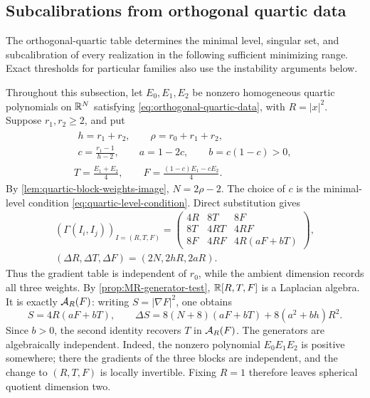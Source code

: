 \subsection{Subcalibrations from orthogonal quartic data}
\label{sec:quartic-table-existence}

The orthogonal-quartic table determines the minimal level, singular
set, and subcalibration of every realization in the following sufficient
minimizing range. Exact thresholds for particular families also use
the instability arguments below.

Throughout this subsection, let $E_0,E_1,E_2$ be nonzero homogeneous
quartic polynomials on $\mathbb R^N$ satisfying
\eqref{eq:orthogonal-quartic-data}, with $R=|x|^2$.  Suppose
$r_1,r_2\geq2$, and put
\begin{gather}
 \begin{gathered}
 h=r_1+r_2,\qquad \rho=r_0+r_1+r_2,\\
 c=\frac{r_1-1}{h-2},\qquad a=1-2c,\qquad b=c(1-c)>0,
 \end{gathered}
 \label{eq:quartic-general-weights}\\
 T=\frac{E_1+E_2}{4},\qquad
 F=\frac{(1-c)E_1-cE_2}{4}.
 \label{eq:quartic-general-generators}
\end{gather}
By \cref{lem:quartic-block-weights-image}, $N=2\rho-2$.
The choice of $c$ is the minimal-level condition
\eqref{eq:quartic-level-condition}.  Direct substitution gives
\begin{equation}\label{bh:reduced-table}
 \begin{gathered}
 (\Gamma(I_i,I_j))_{I=(R,T,F)}=
 \begin{pmatrix}
 4R&8T&8F\\
 8T&4RT&4RF\\
 8F&4RF&4R(aF+bT)
 \end{pmatrix},\\
 (\Delta R,\Delta T,\Delta F)=(2N,2hR,2aR).
 \end{gathered}
\end{equation}
Thus the gradient table is independent of $r_0$, while the ambient
dimension records all three weights.  By
\cref{prop:MR-generator-test}, $\mathbb R[R,T,F]$ is a Laplacian algebra.
It is exactly $\mathcal A_R(F)$: writing $S=|\nabla F|^2$, one obtains
\[
 S=4R(aF+bT),\qquad
 \Delta S=8(N+8)(aF+bT)+8(a^2+bh)R^2.
\]
Since $b>0$, the second identity recovers $T$ in $\mathcal A_R(F)$.
The generators are algebraically independent.  Indeed, the nonzero
polynomial $E_0E_1E_2$ is positive somewhere; there the gradients of
the three blocks are independent, and the change to $(R,T,F)$ is
locally invertible.  Fixing $R=1$ therefore leaves spherical quotient
dimension two.

